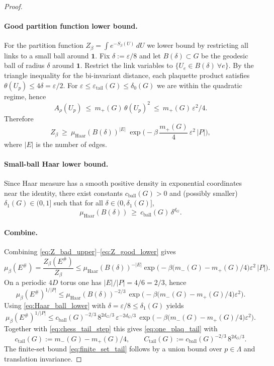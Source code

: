 \begin{proof}
\paragraph{Good partition function lower bound.}
For the partition function $Z_\beta=\int e^{-S_\beta(U)}\,dU$ we lower bound by restricting all links to a small ball around $\mathbf 1$.
Fix $\delta:=\varepsilon/8$ and let $B(\delta)\subset G$ be the geodesic ball of radius $\delta$ around $\mathbf 1$.
Restrict the link variables to $\{U_e\in B(\delta)\ \forall e\}$.
By the triangle inequality for the bi-invariant distance, each plaquette product satisfies
$\theta(U_p)\le 4\delta=\varepsilon/2$.
For $\varepsilon\le \varepsilon_{\mathrm{tail}}(G)\le\delta_0(G)$ we are within the quadratic regime, hence
\[
A_\rho(U_p)\ \le\ m_+(G)\,\theta(U_p)^2\ \le\ m_+(G)\,\varepsilon^2/4.
\]
Therefore
\begin{equation}\label{eq:Z_good_lower}
Z_\beta\ \ge\ \mu_{\mathrm{Haar}}(B(\delta))^{|E|}\;
\exp\!\Big(-\beta\,\frac{m_+(G)}{4}\,\varepsilon^2\,|P|\Big),
\end{equation}
where $|E|$ is the number of edges.

\paragraph{Small-ball Haar lower bound.}
Since Haar measure has a smooth positive density in exponential coordinates near the identity,
there exist constants $c_{\mathrm{ball}}(G)>0$ and (possibly smaller) $\delta_1(G)\in(0,1]$ such that for all $\delta\in(0,\delta_1(G)]$,
\begin{equation}\label{eq:Haar_ball_lower}
\mu_{\mathrm{Haar}}(B(\delta))\ \ge\ c_{\mathrm{ball}}(G)\,\delta^{d_G}.
\end{equation}

\paragraph{Combine.}
Combining \eqref{eq:Z_bad_upper}--\eqref{eq:Z_good_lower} gives
\[
\mu_\beta(E^{\#})
=\frac{Z_\beta(E^{\#})}{Z_\beta}
\le
\mu_{\mathrm{Haar}}(B(\delta))^{-|E|}
\exp\!\Big(-\beta\big(m_-(G)-m_+(G)/4\big)\varepsilon^2\,|P|\Big).
\]
On a periodic $4D$ torus one has $|E|/|P|=4/6=2/3$, hence
\[
\mu_\beta(E^{\#})^{1/|P|}
\le
\mu_{\mathrm{Haar}}(B(\delta))^{-2/3}\,
\exp\!\Big(-\beta\big(m_-(G)-m_+(G)/4\big)\varepsilon^2\Big).
\]
Using \eqref{eq:Haar_ball_lower} with $\delta=\varepsilon/8\le \delta_1(G)$ yields
\[
\mu_\beta(E^{\#})^{1/|P|}
\le
c_{\mathrm{ball}}(G)^{-2/3}\,8^{2d_G/3}\,\varepsilon^{-2d_G/3}\,
\exp\!\Big(-\beta\big(m_-(G)-m_+(G)/4\big)\varepsilon^2\Big).
\]
Together with \eqref{eq:chess_tail_step} this gives \eqref{eq:one_plaq_tail} with
\[
c_{\mathrm{tail}}(G):=m_-(G)-m_+(G)/4,
\qquad
C_{\mathrm{tail}}(G):=c_{\mathrm{ball}}(G)^{-2/3}\,8^{2d_G/3}.
\]
The finite-set bound \eqref{eq:finite_set_tail} follows by a union bound over $p\in\Lambda$ and translation invariance.
\end{proof}

